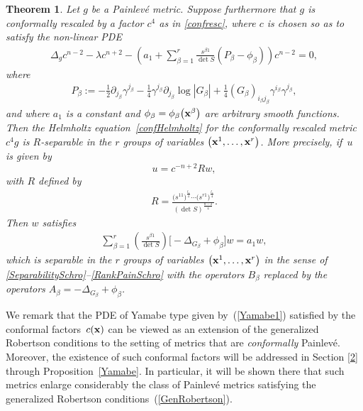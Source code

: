 \documentclass[pdftex]{sigma}
\numberwithin{equation}{section}
\newtheorem{Theorem}{Theorem}[section]
\begin{document}
\begin{Theorem}\label{maintheorem3}
Let $g$ be a Painlev\'e metric. Suppose furthermore that $g$ is conformally rescaled by a factor $c^{4}$ as in \eqref{confresc}, where $c$ is chosen so as to satisfy the non-linear PDE
\begin{gather}\label{eqnc}
\Delta_{g}c^{n-2}-\lambda c^{n+2}-\left( a_1 + \sum_{\beta =1}^{r}\frac{s^{\beta 1}}{\det S}(P_{\beta}-\phi_{\beta}) \right) c^{n-2}=0,
\end{gather}
where
\begin{gather*}%
P_{\beta}:=-\frac{1}{2}\partial_{j_{\beta}}\gamma^{j_{\beta}}-\frac{1}{4}\gamma^{j_{\beta}}\partial_{j_{\beta}}\log |G_{\beta}|+\frac{1}{4}(G_{\beta})_{i_{\beta}j_{\beta}}\gamma^{i_{\beta}}\gamma^{j_{\beta}},
\end{gather*}
and where $a_1$ is a constant and $\phi_{\beta}=\phi_{\beta}\big({{\bf x}}^{\beta}\big)$ are arbitrary smooth functions. Then the Helmholtz equation~\eqref{confHelmholtz} for the conformally rescaled metric $c^{4}g$ is $R$-separable in the $r$ groups of variables $\big({{\bf x}^{1}},\dots,{{\bf x}^{r}}\big)$. More precisely, if~$u$ is given by
\[
u=c^{-n+2} R w,
\]
with $R$ defined by
\begin{gather}\label{Rdef}
R=\frac{\big(s^{11}\big)^\frac{l_1}{4} \cdots \big(s^{r1}\big)^{\frac{l_r}{4}}}{(\det S)^{\frac{n-2}{4}}}.
\end{gather}
Then $w$ satisfies
\begin{gather}\label{sepeqw}
\sum_{\beta=1}^{r}\left(\frac{s^{\beta 1}}{\det S}\right)\big[{-}\Delta_{G_{\beta}}+\phi_{\beta}\big]w = a_1 w,
\end{gather}
which is separable in the $r$ groups of variables $\big({{\bf x}^{1}},\dots,{{\bf x}^{r}}\big)$ in the sense of \eqref{SeparabilitySchro}--\eqref{RankPainSchro} with the operators $B_\beta$ replaced by the operators $A_\beta = -\Delta_{G_{\beta}} + \phi_\beta$.
\end{Theorem}

We remark that the PDE of Yamabe type given by~(\ref{Yamabe1}) satisfied by the conformal fac\-tors~$c({\bf x})$ can be viewed as an extension of the generalized Robertson conditions to the setting of metrics that are \emph{conformally} Painlev\'e. Moreover, the existence of such conformal factors will be addressed in Section \ref{2} through Proposition~\ref{Yamabe}. In particular, it will be shown there that such metrics enlarge considerably the class of Painlev\'e metrics satisfying the generalized Robertson conditions~(\ref{GenRobertson}).
\end{document}
